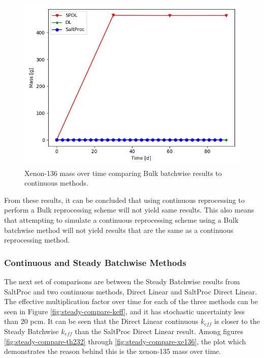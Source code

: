 \begin{figure}[H]
  \centering
  \includegraphics[scale=0.7]{images/soln-3-Xe136.png}
  \caption{Xenon-136 mass over time comparing Bulk batchwise results to continuous methods.}
   \label{fig:bulk-comapre-xe136}
\end{figure}

From these results, it can be concluded that using continuous reprocessing to perform a Bulk reprocessing scheme will not yield same results. This also means that attempting to simulate a continuous reprocessing scheme using a Bulk batchwise method will not yield results that are the same as a continuous reprocessing method.

\subsubsection{Continuous and Steady Batchwise Methods}

The next set of comparisons are between the Steady Batchwise results from SaltProc and two continuous methods, Direct Linear and SaltProc Direct Linear. The effective multiplication factor over time for each of the three methods can be seen in Figure \ref{fig:steady-compare-keff}, and it has stochastic uncertainty less than 20 pcm.
It can be seen that the Direct Linear continuous $k_{eff}$ is closer to the Steady Batchwise $k_{eff}$ than the SaltProc Direct Linear result. Among figures \ref{fig:steady-compare-th232} through \ref{fig:steady-compare-xe136}, the plot which demonstrates the reason behind this is the xenon-135 mass over time.

